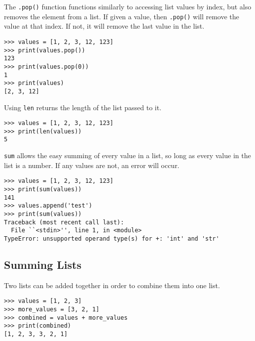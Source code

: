 \documentclass[11pt]{cselabheader}
\begin{document}
The \lstinline{.pop()} function functions similarly to accessing list values by index, but also removes the element from a list. If given a value, then \lstinline{.pop()} will remove the value at that index. If not, it will remove the last value in the list.

\begin{lstlisting}[style=ipython]
>>> values = [1, 2, 3, 12, 123]
>>> print(values.pop())
123
>>> print(values.pop(0))
1
>>> print(values)
[2, 3, 12]
\end{lstlisting}

Using \lstinline{len} returns the length of the list passed to it.

\begin{lstlisting}[style=ipython]
>>> values = [1, 2, 3, 12, 123]
>>> print(len(values))
5
\end{lstlisting}

\lstinline{sum} allows the easy summing of every value in a list, so long as every value in the list is a number. If any values are not, an error will occur.

\begin{lstlisting}[style=ipython]
>>> values = [1, 2, 3, 12, 123]
>>> print(sum(values))
141
>>> values.append('test')
>>> print(sum(values))
Traceback (most recent call last):
  File ``<stdin>'', line 1, in <module>
TypeError: unsupported operand type(s) for +: 'int' and 'str'
\end{lstlisting}

\subsection{Summing Lists}
Two lists can be added together in order to combine them into one list.

\begin{lstlisting}[style=ipython]
>>> values = [1, 2, 3]
>>> more_values = [3, 2, 1]
>>> combined = values + more_values
>>> print(combined)
[1, 2, 3, 3, 2, 1]
\end{lstlisting}
\end{document}

